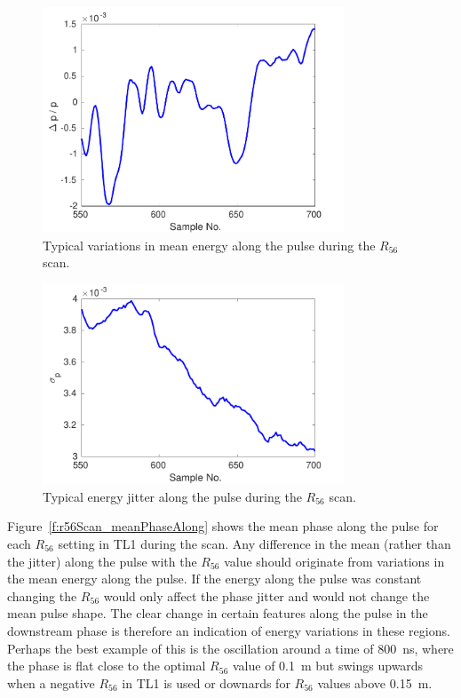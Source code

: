 \begin{figure}
  \centering
  \includegraphics[width=0.8\textwidth]{Figures/propagation/R56ScanGunWiggle_MeanEnergyAlong}
  \caption{Typical variations in mean energy along the pulse during the \(R_{56}\) scan.}
  \label{f:R56ScanGunWiggle_MeanEnergyAlong}
\end{figure}

\begin{figure}
  \centering
  \includegraphics[width=0.8\textwidth]{Figures/propagation/R56ScanGunWiggle_EnergyJitterAlong}
  \caption{Typical energy jitter along the pulse during the \(R_{56}\) scan.}
  \label{f:R56ScanGunWiggle_EnergyJitterAlong}
\end{figure}

Figure~\ref{f:r56Scan_meanPhaseAlong} shows the mean phase along the pulse for each \(R_{56}\) setting in TL1 during the scan. Any difference in the mean (rather than the jitter) along the pulse with the \(R_{56}\) value should originate from variations in the mean energy along the pulse. If the energy along the pulse was constant changing the \(R_{56}\) would only affect the phase jitter and would not change the mean pulse shape. The clear change in certain features along the pulse in the downstream phase is therefore an indication of energy variations in these regions. Perhaps the best example of this is the oscillation around a time of 800~ns, where the phase is flat close to the optimal \(R_{56}\) value of 0.1~m but swings upwards when a negative \(R_{56}\) in TL1 is used or downards for \(R_{56}\) values above 0.15~m.

